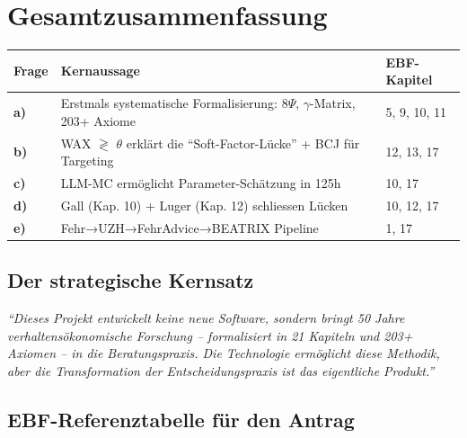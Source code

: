 \documentclass[11pt,a4paper]{article}
\begin{document}
\section{Gesamtzusammenfassung}

\begin{center}
\begin{tabular}{p{1.5cm}p{6cm}p{4cm}}
\toprule
\textbf{Frage} & \textbf{Kernaussage} & \textbf{EBF-Kapitel} \\
\midrule
\textbf{a)} & Erstmals systematische Formalisierung: 8$\Psi$, $\gamma$-Matrix, 203+ Axiome & 5, 9, 10, 11 \\
\textbf{b)} & WAX $\gtrless$ $\theta$ erklärt die ``Soft-Factor-Lücke'' + BCJ für Targeting & 12, 13, 17 \\
\textbf{c)} & LLM-MC ermöglicht Parameter-Schätzung in 125h & 10, 17 \\
\textbf{d)} & Gall (Kap. 10) + Luger (Kap. 12) schliessen Lücken & 10, 12, 17 \\
\textbf{e)} & Fehr→UZH→FehrAdvice→BEATRIX Pipeline & 1, 17 \\
\bottomrule
\end{tabular}
\end{center}

\subsection*{Der strategische Kernsatz}

\begin{tcolorbox}[colback=innoblue!10!white, colframe=innoblue!75!black]
\centering
\textit{``Dieses Projekt entwickelt keine neue Software, sondern bringt 50 Jahre verhaltensökonomische Forschung -- formalisiert in 21 Kapiteln und 203+ Axiomen -- in die Beratungspraxis. Die Technologie ermöglicht diese Methodik, aber die Transformation der Entscheidungspraxis ist das eigentliche Produkt.''}
\end{tcolorbox}

\subsection*{EBF-Referenztabelle für den Antrag}
\end{document}
